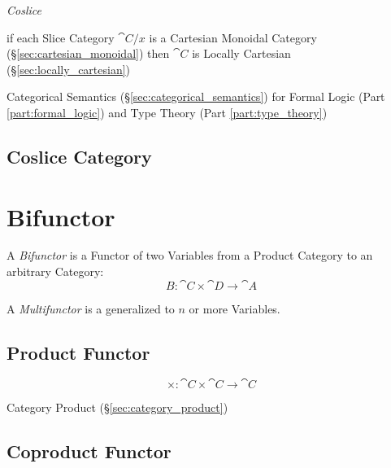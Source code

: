 \emph{Coslice}

if each Slice Category $\cat{C}/x$ is a Cartesian Monoidal Category
(\S\ref{sec:cartesian_monoidal}) then $\cat{C}$ is Locally Cartesian
(\S\ref{sec:locally_cartesian})

Categorical Semantics (\S\ref{sec:categorical_semantics}) for Formal
Logic (Part \ref{part:formal_logic}) and Type Theory (Part
\ref{part:type_theory})



\subsection{Coslice Category}\label{sec:coslice_category}



\section{Bifunctor}\label{sec:bifunctor}

A \emph{Bifunctor} is a Functor of two Variables from a Product
Category to an arbitrary Category:
\[
  B : \cat{C} \times \cat{D} \rightarrow \cat{A}
\]

A \emph{Multifunctor} is a generalized to $n$ or more Variables.



\subsection{Product Functor}\label{sec:product_functor}

\[
  \times : \cat{C} \times \cat{C} \rightarrow \cat{C}
\]

Category Product (\S\ref{sec:category_product})



\subsection{Coproduct Functor}\label{sec:coproduct_functor}

